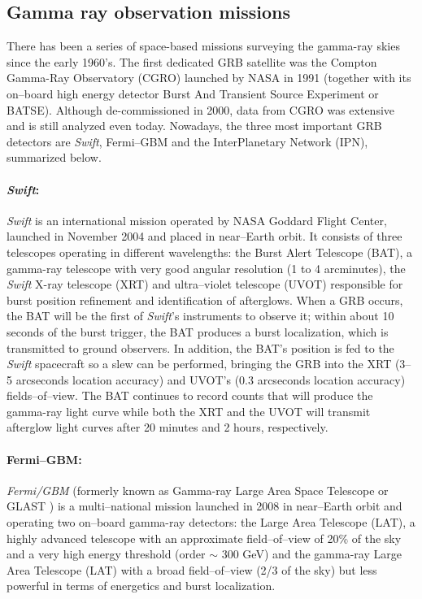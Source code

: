 \subsection{Gamma ray observation missions}
There has been a series of space-based missions surveying the gamma-ray skies since the early 1960's. The first dedicated GRB satellite was the Compton Gamma-Ray Observatory (CGRO) launched by NASA in 1991 (together with its on--board high energy detector Burst And Transient Source Experiment or BATSE). Although de-commissioned in 2000, data from CGRO was extensive and is still analyzed even today. Nowadays, the three most important GRB detectors are \emph{Swift}, Fermi--GBM and the InterPlanetary Network (IPN), summarized below.

\paragraph{\emph{Swift}:}
\emph{Swift} \cite{swiftdatasheet} is an international mission operated by NASA Goddard Flight Center, launched in November 2004 and placed in near--Earth orbit. It consists of three telescopes operating in different wavelengths: the Burst Alert Telescope (BAT), a gamma-ray telescope with very good angular resolution (1 to 4 arcminutes), the \emph{Swift} X-ray telescope (XRT) and ultra--violet telescope (UVOT) responsible for burst position refinement and identification of afterglows. When a GRB occurs, the BAT will be the first of \emph{Swift}'s instruments to observe it; within about 10 seconds of the burst trigger, the BAT produces a burst localization, which is transmitted to ground observers. In addition, the BAT's position is fed to the \emph{Swift} spacecraft so a slew can be performed, bringing the GRB into the XRT (3--5 arcseconds location accuracy) and UVOT's (0.3 arcseconds location accuracy) fields--of--view. The BAT continues to record counts that will produce the gamma-ray light curve while both the XRT and the UVOT will transmit afterglow light curves after 20 minutes and 2 hours, respectively.  

\paragraph{Fermi--GBM:}
\emph{Fermi/GBM} (formerly known as Gamma-ray Large Area Space Telescope or GLAST \cite{fermisite2}) is a multi--national mission launched in 2008 in near--Earth orbit and operating two on--board gamma-ray detectors: the Large Area Telescope (LAT), a highly advanced telescope with an approximate field--of--view of 20\% of the sky and a very high energy threshold (order $\sim$ 300 GeV) and the gamma-ray Large Area Telescope (LAT) with a broad field--of--view (2/3 of the sky) but less powerful in terms of energetics and burst localization.

